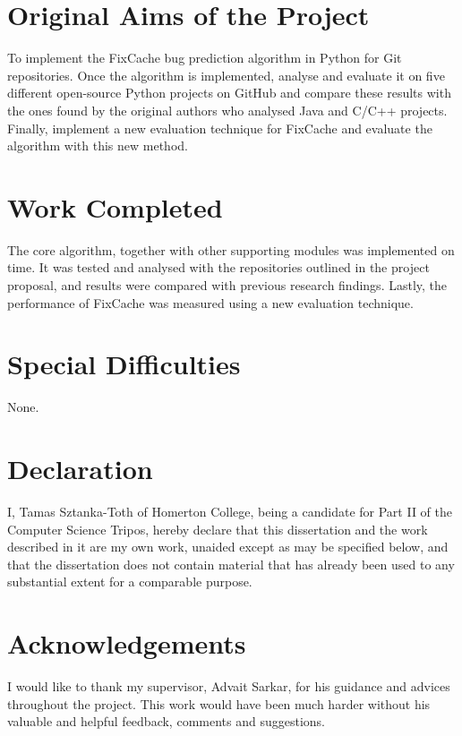 \documentclass[12pt,twoside,notitlepage]{report}
\newcommand{\fxch}{FixCache}
\begin{document}
\section*{Original Aims of the Project}
To implement the \fxch{} bug prediction algorithm in Python for Git repositories.  Once the algorithm is implemented, analyse and evaluate it on five different open-source Python projects on GitHub and compare these results with the ones found by the original authors who analysed Java and C/C++ projects. Finally, implement a new evaluation technique for \fxch{} and evaluate the algorithm with this new method.
\clearpage
\section*{Work Completed}
The core algorithm, together with other supporting modules was implemented on time. It was tested and analysed with the repositories outlined in the project proposal, and results were compared with previous research findings. Lastly, the performance of \fxch{} was measured using a new evaluation technique.

\section*{Special Difficulties}
None.
 
\newpage
\section*{Declaration}

I, Tamas Sztanka-Toth of Homerton College, being a candidate for Part II of the Computer
Science Tripos, hereby declare
that this dissertation and the work described in it are my own work,
unaided except as may be specified below, and that the dissertation
does not contain material that has already been used to any substantial
extent for a comparable purpose.

\bigskip
{}

\medskip
{}

\cleardoublepage

\tableofcontents

\listoffigures

\newpage
\section*{Acknowledgements}
I would like to thank my supervisor, Advait Sarkar, for his guidance and advices throughout the project. This work would have been much harder without his valuable and helpful feedback, comments and suggestions.
\end{document}
